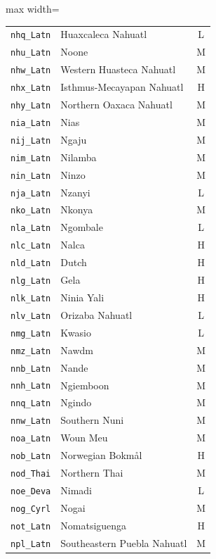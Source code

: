 {\begin{adjustbox}{max width=\textwidth}
\begin{tabular}{llc}
        \texttt{nhq\_Latn} & Huaxcaleca Nahuatl & L \\
        \texttt{nhu\_Latn} & Noone & M \\
        \texttt{nhw\_Latn} & Western Huasteca Nahuatl & M \\
        \texttt{nhx\_Latn} & Isthmus-Mecayapan Nahuatl & H \\
        \texttt{nhy\_Latn} & Northern Oaxaca Nahuatl & M \\
        \texttt{nia\_Latn} & Nias & M \\
        \texttt{nij\_Latn} & Ngaju & M \\
        \texttt{nim\_Latn} & Nilamba & M \\
        \texttt{nin\_Latn} & Ninzo & M \\
        \texttt{nja\_Latn} & Nzanyi & L \\
        \texttt{nko\_Latn} & Nkonya & M \\
        \texttt{nla\_Latn} & Ngombale & L \\
        \texttt{nlc\_Latn} & Nalca & H \\
        \texttt{nld\_Latn} & Dutch & H \\
        \texttt{nlg\_Latn} & Gela & H \\
        \texttt{nlk\_Latn} & Ninia Yali & H \\
        \texttt{nlv\_Latn} & Orizaba Nahuatl & L \\
        \texttt{nmg\_Latn} & Kwasio & L \\
        \texttt{nmz\_Latn} & Nawdm & M \\
        \texttt{nnb\_Latn} & Nande & M \\
        \texttt{nnh\_Latn} & Ngiemboon & M \\
        \texttt{nnq\_Latn} & Ngindo & M \\
        \texttt{nnw\_Latn} & Southern Nuni & M \\
        \texttt{noa\_Latn} & Woun Meu & M \\
        \texttt{nob\_Latn} & Norwegian Bokmål & H \\
        \texttt{nod\_Thai} & Northern Thai & M \\
        \texttt{noe\_Deva} & Nimadi & L \\
        \texttt{nog\_Cyrl} & Nogai & M \\
        \texttt{not\_Latn} & Nomatsiguenga & H \\
        \texttt{npl\_Latn} & Southeastern Puebla Nahuatl & M \\

\end{tabular}
\end{adjustbox}}
